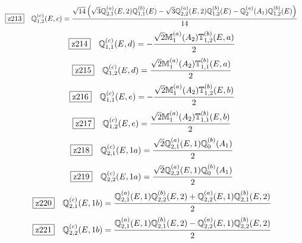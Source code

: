 \documentclass[fleqn,10pt,landscape]{jsarticle}
\begin{document}
\begin{dmath*}
\hspace*{3mm}\fbox{z213}\quad \mathbb{Q}_{1,2}^{(c)}(E,c)=\frac{\sqrt{14} \left(\sqrt{3} \mathbb{Q}_{2,1}^{(a)}(E,2) \mathbb{Q}_{1,1}^{(b)}(E) - \sqrt{3} \mathbb{Q}_{2,2}^{(a)}(E,2) \mathbb{Q}_{1,2}^{(b)}(E) - \mathbb{Q}_{2}^{(a)}(A_{1}) \mathbb{Q}_{1,2}^{(b)}(E)\right)}{14}
\end{dmath*}
\begin{dmath*}
\hspace*{3mm}\fbox{z214}\quad \mathbb{Q}_{1,1}^{(c)}(E,d)=- \frac{\sqrt{2} \mathbb{M}_{1}^{(a)}(A_{2}) \mathbb{T}_{1,2}^{(b)}(E,a)}{2}
\end{dmath*}
\begin{dmath*}
\hspace*{3mm}\fbox{z215}\quad \mathbb{Q}_{1,2}^{(c)}(E,d)=\frac{\sqrt{2} \mathbb{M}_{1}^{(a)}(A_{2}) \mathbb{T}_{1,1}^{(b)}(E,a)}{2}
\end{dmath*}
\begin{dmath*}
\hspace*{3mm}\fbox{z216}\quad \mathbb{Q}_{1,1}^{(c)}(E,e)=- \frac{\sqrt{2} \mathbb{M}_{1}^{(a)}(A_{2}) \mathbb{T}_{1,2}^{(b)}(E,b)}{2}
\end{dmath*}
\begin{dmath*}
\hspace*{3mm}\fbox{z217}\quad \mathbb{Q}_{1,2}^{(c)}(E,e)=\frac{\sqrt{2} \mathbb{M}_{1}^{(a)}(A_{2}) \mathbb{T}_{1,1}^{(b)}(E,b)}{2}
\end{dmath*}
\begin{dmath*}
\hspace*{3mm}\fbox{z218}\quad \mathbb{Q}_{2,1}^{(c)}(E,1a)=\frac{\sqrt{2} \mathbb{Q}_{2,1}^{(a)}(E,1) \mathbb{Q}_{0}^{(b)}(A_{1})}{2}
\end{dmath*}
\begin{dmath*}
\hspace*{3mm}\fbox{z219}\quad \mathbb{Q}_{2,2}^{(c)}(E,1a)=\frac{\sqrt{2} \mathbb{Q}_{2,2}^{(a)}(E,1) \mathbb{Q}_{0}^{(b)}(A_{1})}{2}
\end{dmath*}
\begin{dmath*}
\hspace*{3mm}\fbox{z220}\quad \mathbb{Q}_{2,1}^{(c)}(E,1b)=\frac{\mathbb{Q}_{2,1}^{(a)}(E,1) \mathbb{Q}_{2,2}^{(b)}(E,2) + \mathbb{Q}_{2,2}^{(a)}(E,1) \mathbb{Q}_{2,1}^{(b)}(E,2)}{2}
\end{dmath*}
\begin{dmath*}
\hspace*{3mm}\fbox{z221}\quad \mathbb{Q}_{2,2}^{(c)}(E,1b)=\frac{\mathbb{Q}_{2,1}^{(a)}(E,1) \mathbb{Q}_{2,1}^{(b)}(E,2) - \mathbb{Q}_{2,2}^{(a)}(E,1) \mathbb{Q}_{2,2}^{(b)}(E,2)}{2}
\end{dmath*}
\end{document}
